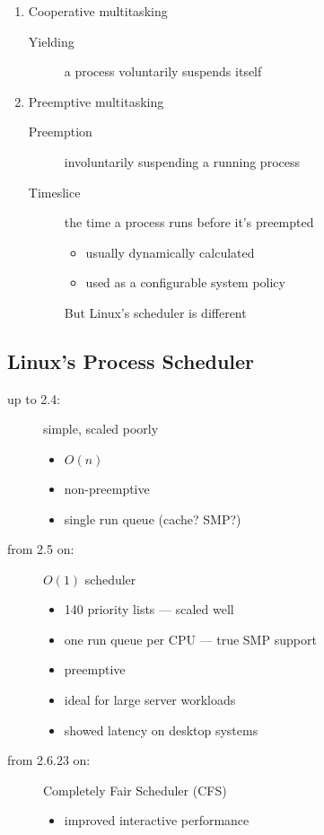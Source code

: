 \begin{frame}
  \begin{enumerate}
  \item Cooperative multitasking
    \begin{description}
    \item[Yielding] a process voluntarily suspends itself
    \end{description}
  \item Preemptive multitasking
    \begin{description}
    \item[Preemption] involuntarily suspending a running process
    \item[Timeslice] the time a process runs before it's preempted
      \begin{itemize}
      \item usually dynamically calculated
      \item used as a configurable system policy
      \end{itemize}
      But Linux's scheduler is different
    \end{description}
  \end{enumerate}
\end{frame}

\subsection{Linux's Process Scheduler}

\begin{frame}
  \begin{description}
  \item[up to 2.4:] simple, scaled poorly
    \begin{multicols}{2}
      \begin{itemize}
      \item $O(n)$
      \item non-preemptive
      \item single run queue (cache? SMP?)
      \end{itemize}
    \end{multicols}
  \item[from 2.5 on:] $O(1)$ scheduler
    \begin{itemize}
    \item 140 priority lists --- scaled well
    \item one run queue per CPU --- true SMP support
    \item preemptive
    \item ideal for large server workloads
    \item showed latency on desktop systems
    \end{itemize}
  \item[from 2.6.23 on:] Completely Fair Scheduler (CFS)
    \begin{itemize}
    \item improved interactive performance
    \end{itemize}
  \end{description}
\end{frame}

